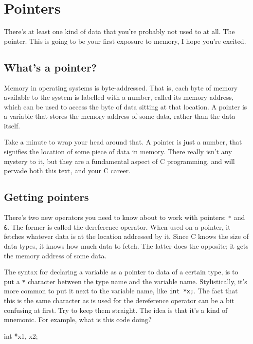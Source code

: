 \documentclass[ebook,11pt,oneside,openany]{memoir}
\newcommand{\cf}[1]{\texttt{#1}}
\begin{document}
\section{Pointers}
There's at least one kind of data that you're probably not used to at all. The pointer. This is going to be your first exposure to memory, I hope you're excited.

\subsection{What's a pointer?}
\label{sec:wtf}

Memory in operating systems is byte-addressed. That is, each byte of memory available to the system is labelled with a number, called its memory address, which can be used to access the byte of data sitting at that location. A pointer is a variable that stores the memory address of some data, rather than the data itself. 

Take a minute to wrap your head around that. A pointer is just a number, that signifies the location of some piece of data in memory. There really isn't any mystery to it, but they are a fundamental aspect of C programming, and will pervade both this text, and your C career. 

\subsection{Getting pointers}

There's two new operators you need to know about to work with pointers: \texttt{*} and \texttt{\&}. The former is called the dereference operator. When used on a pointer, it fetches whatever data is at the location addressed by it. Since C knows the size of data types, it knows how much data to fetch. The latter does the opposite; it gets the memory address of some data.

The syntax for declaring a variable as a pointer to data of a certain type, is to put a \texttt{*} character between the type name and the variable name. Stylistically, it's more common to put it next to the variable name, like \cf{int *x;}. The fact that this is the same character as is used for the dereference operator can be a bit confusing at first. Try to keep them straight. The idea is that it's a kind of mnemonic. For example, what is this code doing?

\begin{code}[language=C]
int *x1, x2;
\end{code}
\end{document}
